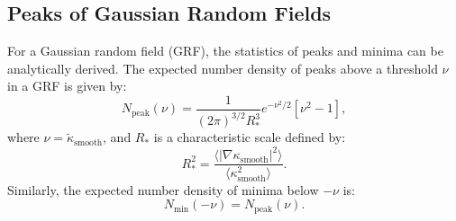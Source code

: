 \subsection{Peaks of Gaussian Random Fields}
For a Gaussian random field (GRF), the statistics of peaks and minima can be analytically derived. The expected number density of peaks above a threshold $\nu$ in a GRF is given by:
\begin{equation}
    N_{\mathrm{peak}}(\nu) = \frac{1}{(2\pi)^{3/2} R_*^3} e^{-\nu^2/2} \left[ \nu^2 - 1 \right],
    \label{eq:bbks_peak}
\end{equation}
where $\nu = \tilde{\kappa}_{\mathrm{smooth}}$, and $R_*$ is a characteristic scale defined by:
\begin{equation}
    R_*^2 = \frac{\langle |\nabla \kappa_{\mathrm{smooth}}|^2 \rangle}{\langle \kappa_{\mathrm{smooth}}^2 \rangle}.
    \label{eq:R_star}
\end{equation}
Similarly, the expected number density of minima below $-\nu$ is:
\begin{equation}
    N_{\mathrm{min}}(-\nu) = N_{\mathrm{peak}}(\nu).
    \label{eq:bbks_min}
\end{equation}

